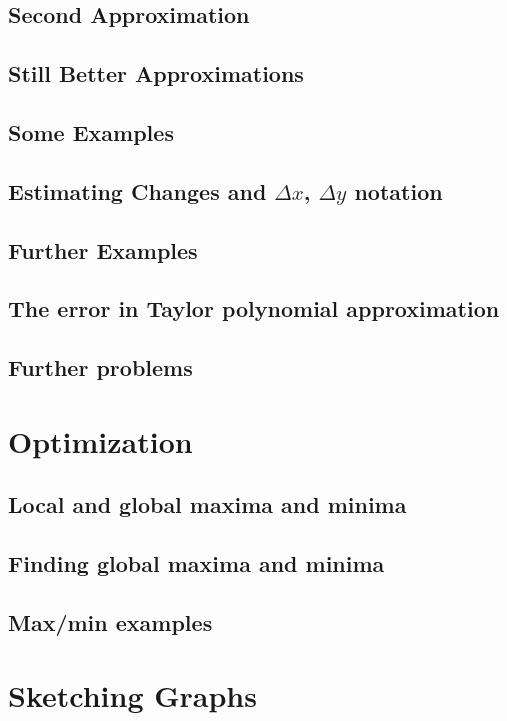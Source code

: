 \documentclass[12pt,letterpaper]{book}
\begin{document}
\subsection{Second Approximation}

\subsection{Still Better Approximations}

\subsection{Some Examples}

\subsection{Estimating Changes and $\Delta x$, $\Delta y$ notation}

\subsection{Further Examples}

\subsection{The error in Taylor polynomial approximation}

\subsection{Further problems}

\section{Optimization}
\subsection{Local and global maxima and minima}

\subsection{Finding global maxima and minima}

\subsection{Max/min examples}

\section{Sketching Graphs}
\end{document}
